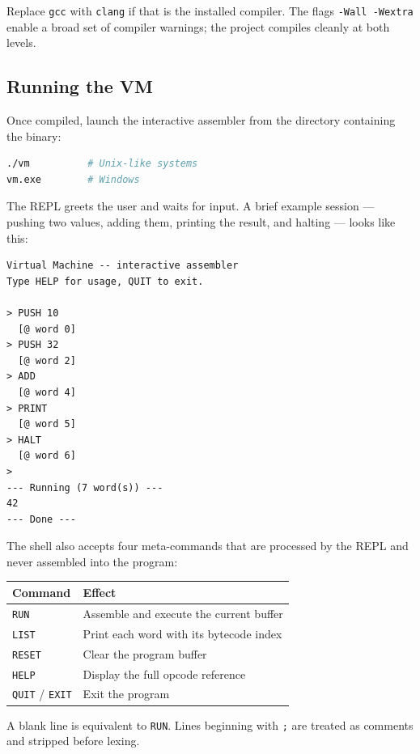 Replace \texttt{gcc} with \texttt{clang} if that is the installed compiler. The flags \texttt{-Wall -Wextra} enable a broad set of compiler warnings; the project compiles cleanly at both levels.

\subsection{Running the VM}

Once compiled, launch the interactive assembler from the directory containing the binary:

\begin{lstlisting}[language=bash]
./vm          # Unix-like systems
vm.exe        # Windows
\end{lstlisting}

The REPL greets the user and waits for input. A brief example session — pushing two values, adding them, printing the result, and halting — looks like this:

\begin{lstlisting}
Virtual Machine -- interactive assembler
Type HELP for usage, QUIT to exit.

> PUSH 10
  [@ word 0]
> PUSH 32
  [@ word 2]
> ADD
  [@ word 4]
> PRINT
  [@ word 5]
> HALT
  [@ word 6]
>
--- Running (7 word(s)) ---
42
--- Done ---
\end{lstlisting}

The shell also accepts four meta-commands that are processed by the REPL and never assembled into the program:

\begin{center}
\begin{tabular}{ll}
\toprule
\textbf{Command} & \textbf{Effect} \\
\midrule
\texttt{RUN}   & Assemble and execute the current buffer \\
\texttt{LIST}  & Print each word with its bytecode index \\
\texttt{RESET} & Clear the program buffer \\
\texttt{HELP}  & Display the full opcode reference \\
\texttt{QUIT} / \texttt{EXIT} & Exit the program \\
\bottomrule
\end{tabular}
\end{center}

A blank line is equivalent to \texttt{RUN}. Lines beginning with \texttt{;} are treated as comments and stripped before lexing.

